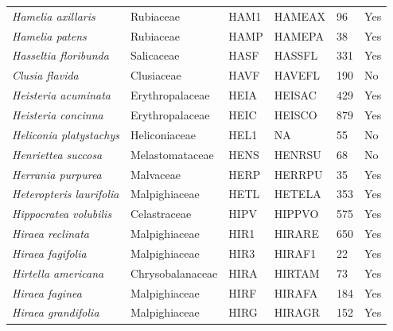 \documentclass[11pt]{article}
\begin{document}
\begin{longtable}{@{}llllll@{}}
\textit{Hamelia axillaris}                            & Rubiaceae        & HAM1   & HAMEAX & 96              & Yes       \\
\textit{Hamelia patens}                               & Rubiaceae        & HAMP   & HAMEPA & 38              & Yes       \\
\textit{Hasseltia floribunda}                         & Salicaceae       & HASF   & HASSFL & 331             & Yes       \\
\textit{Clusia flavida}                               & Clusiaceae       & HAVF   & HAVEFL & 190             & No        \\
\textit{Heisteria acuminata}                          & Erythropalaceae  & HEIA   & HEISAC & 429             & Yes       \\
\textit{Heisteria concinna}                           & Erythropalaceae  & HEIC   & HEISCO & 879             & Yes       \\
\textit{Heliconia platystachys}                       & Heliconiaceae    & HEL1   & NA     & 55              & No        \\
\textit{Henriettea succosa}                           & Melastomataceae  & HENS   & HENRSU & 68              & No        \\
\textit{Herrania purpurea}                            & Malvaceae        & HERP   & HERRPU & 35              & Yes       \\
\textit{Heteropteris laurifolia}                      & Malpighiaceae    & HETL   & HETELA & 353             & Yes       \\
\textit{Hippocratea volubilis}                        & Celastraceae     & HIPV   & HIPPVO & 575             & Yes       \\
\textit{Hiraea reclinata}                             & Malpighiaceae    & HIR1   & HIRARE & 650             & Yes       \\
\textit{Hiraea fagifolia}                             & Malpighiaceae    & HIR3   & HIRAF1 & 22              & Yes       \\
\textit{Hirtella americana}                           & Chrysobalanaceae & HIRA   & HIRTAM & 73              & Yes       \\
\textit{Hiraea faginea}                               & Malpighiaceae    & HIRF   & HIRAFA & 184             & Yes       \\
\textit{Hiraea grandifolia}                           & Malpighiaceae    & HIRG   & HIRAGR & 152             & Yes       \\

\end{longtable}
\end{document}
